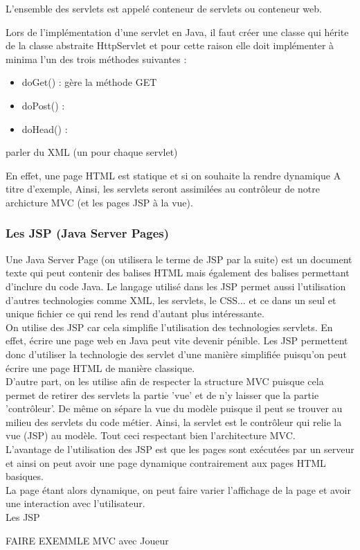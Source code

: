 L'ensemble des servlets est appelé conteneur de servlets ou conteneur web.

Lors de l'implémentation d'une servlet en Java, il faut créer une classe qui hérite
de la classe abstraite HttpServlet et pour cette raison elle doit implémenter à
minima l'un des trois méthodes suivantes :
\begin{itemize}
 \item doGet() : gère la méthode GET 
 \item doPost() :
 \item doHead() :
\end{itemize}


parler du XML (un pour chaque servlet)




En effet, une page HTML est statique et si on souhaite la rendre dynamique
A titre d'exemple, Ainsi, les servlets seront assimilées au contrôleur de notre
archicture MVC (et les pages JSP à la vue).\\

\subsubsection{Les JSP (Java Server Pages)}
Une Java Server Page (on utilisera le terme de JSP par la suite) est un document texte
qui peut contenir des balises HTML mais également des balises permettant d'inclure
du code Java. Le langage utilisé dans les JSP permet aussi l'utilisation d'autres
technologies comme XML, les servlets, le CSS... et ce dans un seul et unique fichier
ce qui rend les rend d'autant plus intéressante.\\

On utilise des JSP car cela simplifie l'utilisation des technologies servlets.
En effet, écrire une page web en Java peut vite devenir pénible. Les JSP permettent
donc d'utiliser la technologie des servlet d'une manière simplifiée puisqu'on peut
écrire une page HTML de manière classique.\\

D'autre part, on les utilise afin de respecter la structure MVC puisque cela permet
de retirer des servlets la partie 'vue' et de n'y laisser que la partie 'contrôleur'.
De même on sépare la vue du modèle puisque il peut se trouver au milieu des servlets
du code métier. Ainsi, la servlet est le contrôleur qui relie la vue (JSP) au modèle.
Tout ceci respectant bien l'architecture MVC.\\


L'avantage de l'utilisation des JSP est que les pages sont exécutées 
par un serveur et ainsi on peut avoir une page dynamique contrairement aux pages
HTML basiques.\\
La page étant alors dynamique, on peut faire varier l'affichage de la page et
avoir une interaction avec l'utilisateur.\\
Les JSP 

FAIRE EXEMMLE MVC avec Joueur
